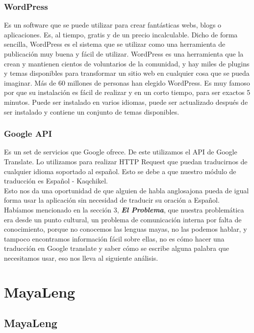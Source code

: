 \documentclass[a4paper,openright,11pt]{article}
\begin{document}
\subsubsection{WordPress}
Es un software que se puede utilizar para crear fantásticas webs, blogs o aplicaciones. Es, al tiempo, gratis y de un precio incalculable. Dicho de forma sencilla, WordPress es el sistema que se utilizar como una herramienta de publicación muy buena y fácil de utilizar. WordPress es una herramienta que la crean y mantienen cientos de voluntarios de la comunidad, y hay miles de plugins y temas disponibles para transformar un sitio web en cualquier cosa que se pueda imaginar. Más de 60 millones de personas han elegido WordPress. Es muy famoso por que su instalación es fácil de realizar y en un corto tiempo, para ser exactos 5 minutos. Puede ser instalado en varios idiomas, puede ser actualizado después de ser instalado y contiene un conjunto de temas disponibles.

\subsubsection{Google API}
Es un set de servicios que Google ofrece. De este utilizamos el API de Google Translate. Lo utilizamos para realizar HTTP Request que puedan traducirnos de cualquier idioma soportado al español. Esto se debe a que nuestro módulo de traducción es Español - Kaqchikel.\\ 
Esto nos da una oportunidad de que alguien de habla anglosajona pueda de igual forma usar la aplicación sin necesidad de traducir su oración a Español.\\

Habíamos mencionado en la sección 3, \textbf{\textit{El Problema}}, que nuestra problemática era desde un punto cultural, un problema de comunicación interna por falta de conocimiento, porque no conocemos las lenguas mayas, no las podemos hablar, y tampoco encontramos información fácil sobre ellas, no es cómo hacer una traducción en Google translate y saber cómo se escribe alguna palabra que necesitamos usar, eso nos lleva al siguiente análisis. \\
\newpage

\section{MayaLeng}
\subsection{MayaLeng}
\end{document}
